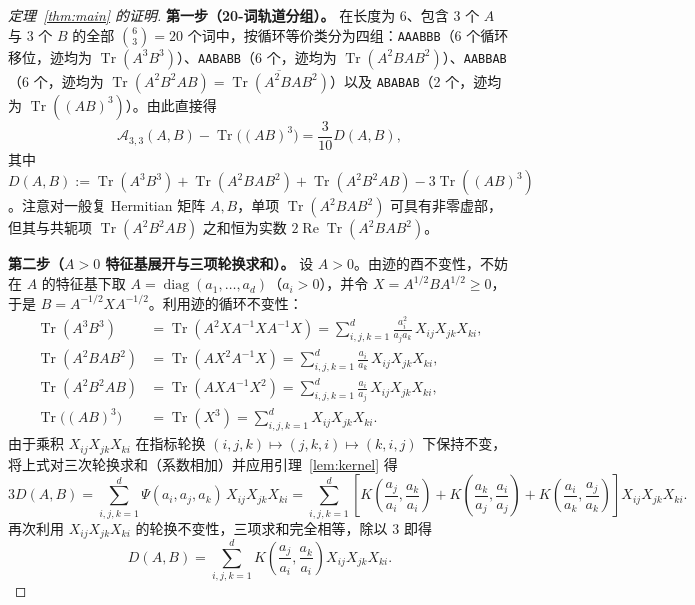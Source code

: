 \documentclass[11pt,a4paper]{article}
\theoremstyle{remark}
\newcommand{\Tr}{\operatorname{Tr}}
\newcommand{\RePart}{\operatorname{Re}}
\begin{document}
\begin{proof}[定理~\ref{thm:main} 的证明]
\textbf{第一步（20-词轨道分组）。}
在长度为 6、包含 3 个 $A$ 与 3 个 $B$ 的全部 $\binom{6}{3}=20$ 个词中，按循环等价类分为四组：\texttt{AAABBB}（6 个循环移位，迹均为 $\Tr(A^3B^3)$）、\texttt{AABABB}（6 个，迹均为 $\Tr(A^2BAB^2)$）、\texttt{AABBAB}（6 个，迹均为 $\Tr(A^2B^2AB)=\overline{\Tr(A^2BAB^2)}$）以及 \texttt{ABABAB}（2 个，迹均为 $\Tr((AB)^3)$）。由此直接得
\[
\mathcal{A}_{3,3}(A,B) - \Tr\!\big((AB)^3\big)
= \frac{3}{10} D(A,B),
\]
其中 $D(A,B) := \Tr(A^3B^3) + \Tr(A^2BAB^2) + \Tr(A^2B^2AB) - 3\Tr((AB)^3)$。注意对一般复 Hermitian 矩阵 $A,B$，单项 $\Tr(A^2BAB^2)$ 可具有非零虚部，但其与共轭项 $\Tr(A^2B^2AB)$ 之和恒为实数 $2\RePart\Tr(A^2BAB^2)$。

\textbf{第二步（$A>0$ 特征基展开与三项轮换求和）。}
设 $A>0$。由迹的酉不变性，不妨在 $A$ 的特征基下取 $A = \operatorname{diag}(a_1,\dots,a_d)$（$a_i > 0$），并令 $X = A^{1/2} B A^{1/2} \ge 0$，于是 $B = A^{-1/2} X A^{-1/2}$。利用迹的循环不变性：
\begin{align*}
  \Tr(A^3 B^3) &= \Tr(A^2 X A^{-1} X A^{-1} X) = \sum_{i,j,k=1}^d \frac{a_i^2}{a_j a_k}\, X_{ij} X_{jk} X_{ki}, \\
  \Tr(A^2 B A B^2) &= \Tr(A X^2 A^{-1} X) = \sum_{i,j,k=1}^d \frac{a_i}{a_k}\, X_{ij} X_{jk} X_{ki}, \\
  \Tr(A^2 B^2 A B) &= \Tr(A X A^{-1} X^2) = \sum_{i,j,k=1}^d \frac{a_i}{a_j}\, X_{ij} X_{jk} X_{ki}, \\
  \Tr\!\big((AB)^3\big) &= \Tr(X^3) = \sum_{i,j,k=1}^d X_{ij} X_{jk} X_{ki}.
\end{align*}
由于乘积 $X_{ij}X_{jk}X_{ki}$ 在指标轮换 $(i,j,k)\mapsto(j,k,i)\mapsto(k,i,j)$ 下保持不变，将上式对三次轮换求和（系数相加）并应用引理~\ref{lem:kernel} 得
\[
3 D(A,B) = \sum_{i,j,k=1}^d \Psi(a_i, a_j, a_k)\, X_{ij} X_{jk} X_{ki}
= \sum_{i,j,k=1}^d \left[K\!\left(\frac{a_j}{a_i},\frac{a_k}{a_i}\right) + K\!\left(\frac{a_k}{a_j},\frac{a_i}{a_j}\right) + K\!\left(\frac{a_i}{a_k},\frac{a_j}{a_k}\right)\right] X_{ij} X_{jk} X_{ki}.
\]
再次利用 $X_{ij}X_{jk}X_{ki}$ 的轮换不变性，三项求和完全相等，除以 $3$ 即得
\begin{equation}\label{eq:triple}
  D(A,B) = \sum_{i,j,k=1}^d K\!\left(\frac{a_j}{a_i}, \frac{a_k}{a_i}\right) X_{ij} X_{jk} X_{ki}.
\end{equation}


\end{proof}
\end{document}
